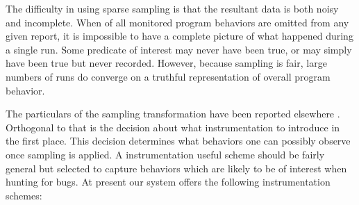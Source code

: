 \documentclass{acm_proc_article-sp}
\begin{document}
The difficulty in using sparse sampling is that the resultant data is
both noisy and incomplete.  When  of all monitored
program behaviors are omitted from any given report, it is impossible
to have a complete picture of what happened during a single run.  Some
predicate of interest may never have been true, or may simply have
been true but never recorded.  However, because sampling is fair,
large numbers of runs do converge on a truthful representation of
overall program behavior.

The particulars of the sampling transformation have been reported
elsewhere \cite{PLDI`03*141}.  Orthogonal to that is the decision
about what instrumentation to introduce in the first place.  This
decision determines what behaviors one can possibly observe once
sampling is applied.  A instrumentation useful scheme should be fairly
general but selected to capture behaviors which are likely to be of
interest when hunting for bugs.  At present our system offers the
following instrumentation schemes:
  
\end{document}
